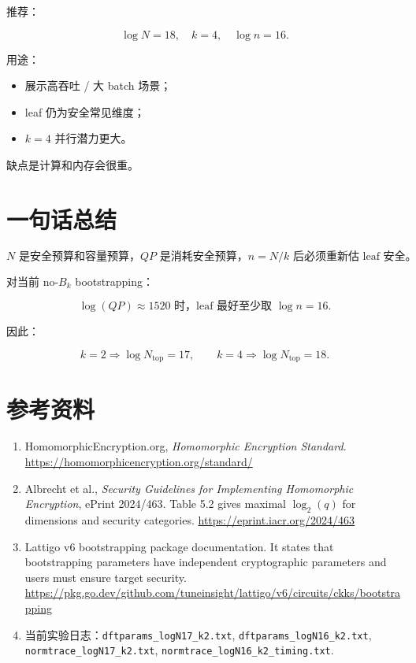 \documentclass[UTF8,11pt,a4paper]{ctexart}
\begin{document}
推荐：

\[
\boxed{
\log N=18,\quad k=4,\quad \log n=16.
}
\]

用途：
\begin{itemize}[leftmargin=2em]
    \item 展示高吞吐 / 大 batch 场景；
    \item leaf 仍为安全常见维度；
    \item $k=4$ 并行潜力更大。
\end{itemize}

缺点是计算和内存会很重。

\section{一句话总结}

\[
\boxed{
N \text{ 是安全预算和容量预算，} QP \text{ 是消耗安全预算，} n=N/k \text{ 后必须重新估 leaf 安全。}
}
\]

对当前 no-$B_k$ bootstrapping：

\[
\boxed{
\log(QP)\approx 1520 \text{ 时，leaf 最好至少取 } \log n=16.
}
\]

因此：

\[
\boxed{
k=2 \Rightarrow \log N_{\text{top}}=17,
\qquad
k=4 \Rightarrow \log N_{\text{top}}=18.
}
\]

\section*{参考资料}

\begin{enumerate}[leftmargin=2em]
    \item HomomorphicEncryption.org, \emph{Homomorphic Encryption Standard}. \url{https://homomorphicencryption.org/standard/}
    \item Albrecht et al., \emph{Security Guidelines for Implementing Homomorphic Encryption}, ePrint 2024/463. Table 5.2 gives maximal $\log_2(q)$ for dimensions and security categories. \url{https://eprint.iacr.org/2024/463}
    \item Lattigo v6 bootstrapping package documentation. It states that bootstrapping parameters have independent cryptographic parameters and users must ensure target security. \url{https://pkg.go.dev/github.com/tuneinsight/lattigo/v6/circuits/ckks/bootstrapping}
    \item 当前实验日志：\texttt{dftparams\_logN17\_k2.txt}, \texttt{dftparams\_logN16\_k2.txt}, \texttt{normtrace\_logN17\_k2.txt}, \texttt{normtrace\_logN16\_k2\_timing.txt}.
\end{enumerate}
\end{document}
